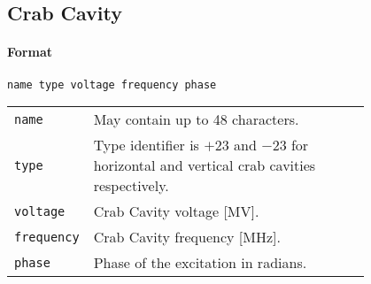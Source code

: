 



\subsection{Crab Cavity} \label{CrabCav}

\paragraph{Format} \texttt{name type voltage frequency phase}

\bigskip
\begin{tabular}{@{}lp{0.8\linewidth}}
    \texttt{name} & May contain up to 48 characters. \\
    \texttt{type} & Type identifier is $+23$ and $-23$ for horizontal and vertical crab cavities respectively. \\
    \texttt{voltage} & Crab Cavity voltage [MV]. \\
    \texttt{frequency} & Crab Cavity frequency [MHz]. \\
    \texttt{phase} & Phase of the excitation in radians.
\end{tabular}

